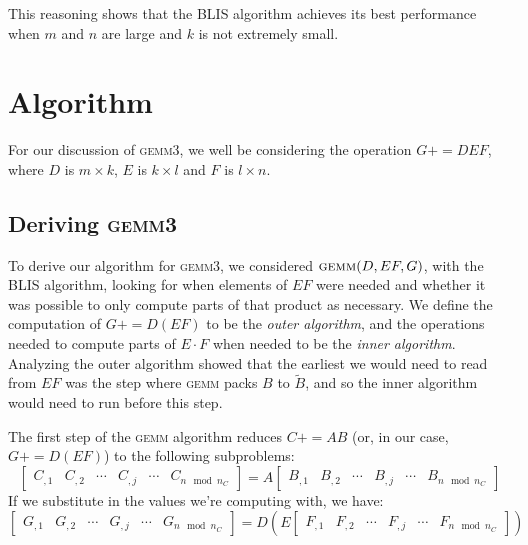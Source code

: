 \documentclass[12pt]{article}
\newcommand*{\pluseq}{\mathrel{{+}{=}}}
\newcommand*{\gemmt}{{\textsc{gemm3}}}
\newcommand*{\gemm}{{\textsc{gemm}}}
\begin{document}
This reasoning shows that the BLIS algorithm achieves its best performance when $m$ and $n$ are large and $k$ is not extremely small.

\section{Algorithm}
For our discussion of \gemmt{}, we well be considering the operation $G \pluseq DEF$, where $D$ is $m \times k$, $E$ is $k \times l$ and $F$ is $l \times n$.

\subsection{Deriving \gemmt}
To derive our algorithm for \gemmt{}, we considered $\gemm{}(D, EF, G)$, with the BLIS algorithm, looking for when elements of $EF$ were needed and whether it was possible to only compute parts of that product as necessary.
We define the computation of $G \pluseq D(EF)$ to be the \emph{outer algorithm}, and the operations needed to compute parts of $E \cdot F$ when needed to be the \emph{inner algorithm}.
Analyzing the outer algorithm showed that the earliest we would need to read from $EF$ was the step where \gemm{} packs $B$ to $\widetilde{B}$, and so the inner algorithm would need to run before this step.

The first step of the \gemm{} algorithm reduces $C \pluseq AB$ (or, in our case, $G \pluseq D(EF)$) to the following subproblems:
\begin{equation*}
  \left[\begin{array}{c|c|c|c|c|c}
    C_{,1}&C_{,2}&\cdots&C_{,j}&\cdots& C_{n \mod n_C}
  \end{array}\right]
  = A
  \left[\begin{array}{c|c|c|c|c|c}
    B_{,1}&B_{,2}&\cdots&B_{,j}&\cdots&B_{n \mod n_C}
  \end{array}\right]
\end{equation*}
If we substitute in the values we're computing with, we have:
\begin{equation*}
  \left[\begin{array}{c|c|c|c|c|c}
    G_{,1}&G_{,2}&\cdots&G_{,j}&\cdots& G_{n \mod n_C}
  \end{array}\right]
  = D\left(
    E
    \left[\begin{array}{c|c|c|c|c|c}
      F_{,1}&F_{,2}&\cdots&F_{,j}&\cdots&F_{n \mod n_C}
    \end{array}\right]
  \right)
\end{equation*}
\end{document}
